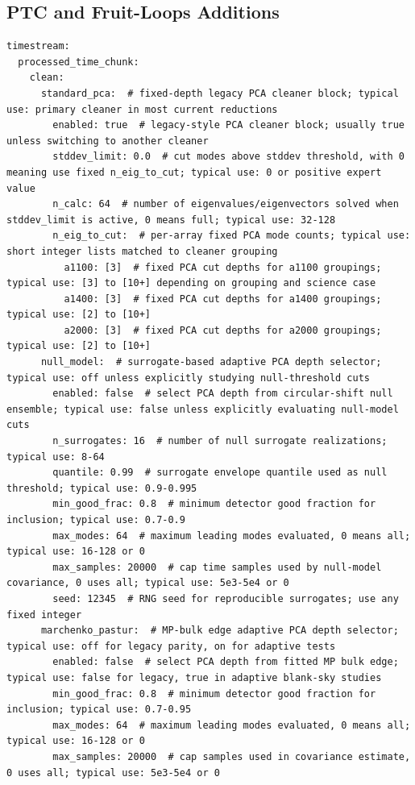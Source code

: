 \documentclass[11pt]{article}
\begin{document}
\subsection{PTC and Fruit-Loops Additions}

\begin{lstlisting}[language={}]
timestream:
  processed_time_chunk:
    clean:
      standard_pca:  # fixed-depth legacy PCA cleaner block; typical use: primary cleaner in most current reductions
        enabled: true  # legacy-style PCA cleaner block; usually true unless switching to another cleaner
        stddev_limit: 0.0  # cut modes above stddev threshold, with 0 meaning use fixed n_eig_to_cut; typical use: 0 or positive expert value
        n_calc: 64  # number of eigenvalues/eigenvectors solved when stddev_limit is active, 0 means full; typical use: 32-128
        n_eig_to_cut:  # per-array fixed PCA mode counts; typical use: short integer lists matched to cleaner grouping
          a1100: [3]  # fixed PCA cut depths for a1100 groupings; typical use: [3] to [10+] depending on grouping and science case
          a1400: [3]  # fixed PCA cut depths for a1400 groupings; typical use: [2] to [10+]
          a2000: [3]  # fixed PCA cut depths for a2000 groupings; typical use: [2] to [10+]
      null_model:  # surrogate-based adaptive PCA depth selector; typical use: off unless explicitly studying null-threshold cuts
        enabled: false  # select PCA depth from circular-shift null ensemble; typical use: false unless explicitly evaluating null-model cuts
        n_surrogates: 16  # number of null surrogate realizations; typical use: 8-64
        quantile: 0.99  # surrogate envelope quantile used as null threshold; typical use: 0.9-0.995
        min_good_frac: 0.8  # minimum detector good fraction for inclusion; typical use: 0.7-0.9
        max_modes: 64  # maximum leading modes evaluated, 0 means all; typical use: 16-128 or 0
        max_samples: 20000  # cap time samples used by null-model covariance, 0 uses all; typical use: 5e3-5e4 or 0
        seed: 12345  # RNG seed for reproducible surrogates; use any fixed integer
      marchenko_pastur:  # MP-bulk edge adaptive PCA depth selector; typical use: off for legacy parity, on for adaptive tests
        enabled: false  # select PCA depth from fitted MP bulk edge; typical use: false for legacy, true in adaptive blank-sky studies
        min_good_frac: 0.8  # minimum detector good fraction for inclusion; typical use: 0.7-0.95
        max_modes: 64  # maximum leading modes evaluated, 0 means all; typical use: 16-128 or 0
        max_samples: 20000  # cap samples used in covariance estimate, 0 uses all; typical use: 5e3-5e4 or 0

\end{lstlisting}
\end{document}
